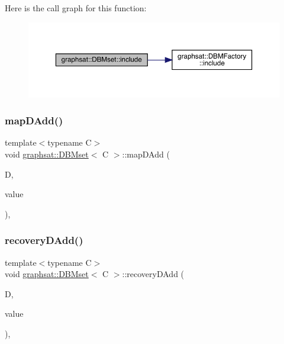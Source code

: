 Here is the call graph for this function\+:
\nopagebreak
\begin{figure}[H]
\begin{center}
\leavevmode
\includegraphics[width=350pt]{classgraphsat_1_1_d_b_mset_a2b49bd304c445eb02b1a544900765d70_cgraph}
\end{center}
\end{figure}
\mbox{\label{classgraphsat_1_1_d_b_mset_aa4027065a59bc886739ceb3b5b0ebcbf}} 
\subsubsection{\texorpdfstring{mapDAdd()}{mapDAdd()}}
{\footnotesize\ttfamily template$<$typename C$>$ \\
void \mbox{\hyperlink{classgraphsat_1_1_d_b_mset}{graphsat\+::\+D\+B\+Mset}}$<$ C $>$\+::map\+D\+Add (\begin{DoxyParamCaption}\item[{C $\ast$}]{D,  }\item[{\mbox{\hyperlink{namespacegraphsat_a9d75165dd4e82d2e03ffd07fe27533d0}{D\+F\+\_\+T}} \&}]{value }\end{DoxyParamCaption})\hspace{0.3cm}{\ttfamily [inline]}, {\ttfamily [private]}}

\mbox{\label{classgraphsat_1_1_d_b_mset_a455f7d48ef36013cf3c8df2ea07e95d8}} 
\subsubsection{\texorpdfstring{recoveryDAdd()}{recoveryDAdd()}}
{\footnotesize\ttfamily template$<$typename C$>$ \\
void \mbox{\hyperlink{classgraphsat_1_1_d_b_mset}{graphsat\+::\+D\+B\+Mset}}$<$ C $>$\+::recovery\+D\+Add (\begin{DoxyParamCaption}\item[{C $\ast$}]{D,  }\item[{\mbox{\hyperlink{namespacegraphsat_a9d75165dd4e82d2e03ffd07fe27533d0}{D\+F\+\_\+T}} \&}]{value }\end{DoxyParamCaption})\hspace{0.3cm}{\ttfamily [inline]}, {\ttfamily [private]}}

